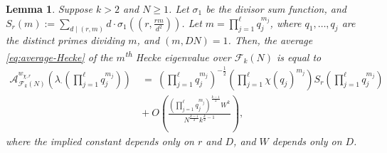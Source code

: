 \documentclass[12pt, reqno,oneside]{amsart}
\theoremstyle{plain}
\newtheorem{lemma}[theorem]{Lemma}
\theoremstyle{definition}
\theoremstyle{remark}
\theoremstyle{plain}
\numberwithin{equation}{section}
\begin{document}
\begin{lemma}\label{lemma:asym-trace-formula}
Suppose $k>2$ and $N\geq1$. Let $\sigma_1$ be the divisor sum function, and $S_r(m) := \sum_{d \mid (r,m)}d \cdot \sigma_1\left(\left(r,\frac{rm}{d^2}\right)\right)$. Let $m=\prod_{j=1}^\ell q_j^{m_j}$, where $q_1,\ldots,q_j$ are the distinct primes dividing $m$, and $(m,DN) = 1$. Then, the average \eqref{eq:average-Hecke} of the $m$\textsuperscript{th} Hecke eigenvalue over $\mathcal{F}_k(N)$ is equal to
\begin{align}\label{eq:main}
\mathcal{A}^{w_{\chi,r}}_{\mathcal{F}_k(N)}\left(\lambda_\cdot\left(\prod\nolimits_{j=1}^\ell q_j^{m_j}\right)\right)\ &= \ \left(\prod\nolimits_{j=1}^\ell q_j^{m_j}\right)^{-\frac{1}{2}}\left(\prod\nolimits_{j=1}^\ell\chi(q_j)^{m_j}\right)S_r\left(\prod\nolimits_{j=1}^\ell q_j^{m_j}\right)\\
\label{eq:error}
& + \ O\left(\frac{\left(\prod\nolimits_{j=1}^\ell q_j^{m_j}\right)^{\frac{k-1}{2}}W^k}{N^{\frac{k-1}{2}}k^{\frac{k}{2}-1}}\right),
\end{align}
where the implied constant depends only on $r$ and $D$, and $W$ depends only on $D$. 
\end{lemma}
\end{document}
